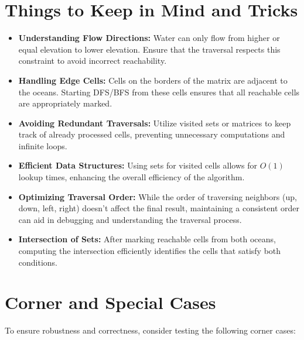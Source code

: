 \section*{Things to Keep in Mind and Tricks}

\begin{itemize}
    \item \textbf{Understanding Flow Directions:} Water can only flow from higher or equal elevation to lower elevation. Ensure that the traversal respects this constraint to avoid incorrect reachability.
    
    \item \textbf{Handling Edge Cells:} Cells on the borders of the matrix are adjacent to the oceans. Starting DFS/BFS from these cells ensures that all reachable cells are appropriately marked.
    
    \item \textbf{Avoiding Redundant Traversals:} Utilize visited sets or matrices to keep track of already processed cells, preventing unnecessary computations and infinite loops.
    
    \item \textbf{Efficient Data Structures:} Using sets for visited cells allows for \(O(1)\) lookup times, enhancing the overall efficiency of the algorithm.
    
    \item \textbf{Optimizing Traversal Order:} While the order of traversing neighbors (up, down, left, right) doesn't affect the final result, maintaining a consistent order can aid in debugging and understanding the traversal process.
    
    \item \textbf{Intersection of Sets:} After marking reachable cells from both oceans, computing the intersection efficiently identifies the cells that satisfy both conditions.
\end{itemize}

\section*{Corner and Special Cases}

To ensure robustness and correctness, consider testing the following corner cases:

